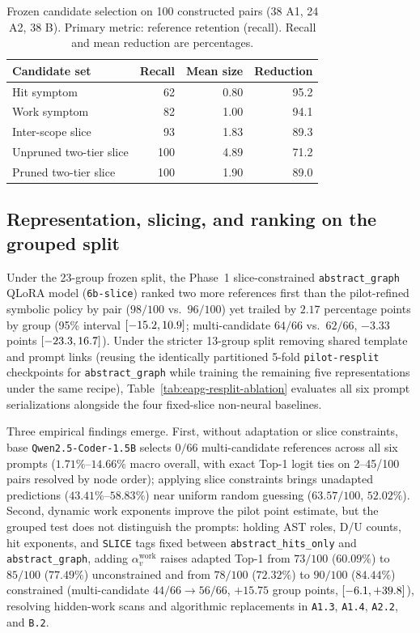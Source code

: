 \begin{table}[t]
\centering\small
\caption{Frozen candidate selection on 100 constructed pairs (38 A1, 24 A2, 38 B). Primary metric: reference retention (recall). Recall and mean reduction are percentages.}
\label{tab:eapg-pilot-slicing}
\begin{tabular}{@{}lrrr@{}}
\toprule
Candidate set & Recall & Mean size & Reduction \\
\midrule
Hit symptom & 62 & 0.80 & 95.2 \\
Work symptom & 82 & 1.00 & 94.1 \\
Inter-scope slice & 93 & 1.83 & 89.3 \\
Unpruned two-tier slice & 100 & 4.89 & 71.2 \\
Pruned two-tier slice & 100 & 1.90 & 89.0 \\
\bottomrule
\end{tabular}
\end{table}

\subsection{Representation, slicing, and ranking on the grouped split}

Under the 23-group frozen split, the Phase~1 slice-constrained \nolinkurl{abstract_graph} QLoRA model (\nolinkurl{6b-slice}) ranked two more references first than the pilot-refined symbolic policy by pair ($98/100$ vs.\ $96/100$) yet trailed by $2.17$ percentage points by group (95\% interval $[-15.2, 10.9]$; multi-candidate $64/66$ vs.\ $62/66$, $-3.33$ points $[-23.3, 16.7]$). Under the stricter 13-group split removing shared template and prompt links (reusing the identically partitioned 5-fold \nolinkurl{pilot-resplit} checkpoints for \nolinkurl{abstract_graph} while training the remaining five representations under the same recipe), Table~\ref{tab:eapg-resplit-ablation} evaluates all six prompt serializations alongside the four fixed-slice non-neural baselines.

Three empirical findings emerge. First, without adaptation or slice constraints, base \texttt{Qwen2.5-Coder-1.5B} selects $0/66$ multi-candidate references across all six prompts ($1.71\%$--$14.66\%$ macro overall, with exact Top-1 logit ties on 2--45/100 pairs resolved by node order); applying slice constraints brings unadapted predictions ($43.41\%$--$58.83\%$) near uniform random guessing ($63.57/100$, $52.02\%$). Second, dynamic work exponents improve the pilot point estimate, but the grouped test does not distinguish the prompts: holding AST roles, D/U counts, hit exponents, and \texttt{SLICE} tags fixed between \nolinkurl{abstract_hits_only} and \nolinkurl{abstract_graph}, adding $\alpha_v^{\mathrm{work}}$ raises adapted Top-1 from $73/100$ ($60.09\%$) to $85/100$ ($77.49\%$) unconstrained and from $78/100$ ($72.32\%$) to $90/100$ ($84.44\%$) constrained (multi-candidate $44/66 \to 56/66$, $+15.75$ group points, $[-6.1, +39.8]$), resolving hidden-work scans and algorithmic replacements in \texttt{A1.3}, \texttt{A1.4}, \texttt{A2.2}, and \texttt{B.2}.

